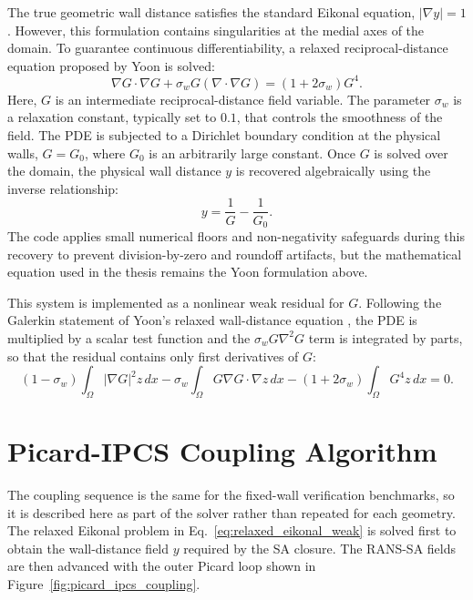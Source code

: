 The true geometric wall distance satisfies the standard Eikonal equation, $|\nabla y| = 1$. However, this formulation contains singularities at the medial axes of the domain. To guarantee continuous differentiability, a relaxed reciprocal-distance equation proposed by Yoon \cite{Yoon2016} is solved:
\begin{equation}
	\nabla G \cdot \nabla G + \sigma_w G (\nabla \cdot \nabla G) = (1 + 2\sigma_w) G^4 .
\end{equation}
Here, $G$ is an intermediate reciprocal-distance field variable. The parameter $\sigma_w$ is a relaxation constant, typically set to $0.1$, that controls the smoothness of the field. The PDE is subjected to a Dirichlet boundary condition at the physical walls, $G = G_0$, where $G_0$ is an arbitrarily large constant. Once $G$ is solved over the domain, the physical wall distance $y$ is recovered algebraically using the inverse relationship:
\begin{equation}
	y = \frac{1}{G} - \frac{1}{G_0}.
\end{equation}
The code applies small numerical floors and non-negativity safeguards during this recovery to prevent division-by-zero and roundoff artifacts, but the mathematical equation used in the thesis remains the Yoon formulation above.

This system is implemented as a nonlinear weak residual for $G$. Following the Galerkin statement of Yoon's relaxed wall-distance equation \cite{Yoon2016}, the PDE is multiplied by a scalar test function and the $\sigma_w G \nabla^2 G$ term is integrated by parts, so that the residual contains only first derivatives of $G$:
\begin{equation}
	(1-\sigma_w)\int_\Omega |\nabla G|^2 z\,dx
	-\sigma_w\int_\Omega G\nabla G\cdot\nabla z\,dx
	-(1+2\sigma_w)\int_\Omega G^4 z\,dx=0 .
	\label{eq:relaxed_eikonal_weak}
\end{equation}

\section{Picard-IPCS Coupling Algorithm}
The coupling sequence is the same for the fixed-wall verification benchmarks, so it is described here as part of the solver rather than repeated for each geometry. The relaxed Eikonal problem in Eq.~\ref{eq:relaxed_eikonal_weak} is solved first to obtain the wall-distance field $y$ required by the SA closure. The RANS-SA fields are then advanced with the outer Picard loop shown in Figure~\ref{fig:picard_ipcs_coupling}.

